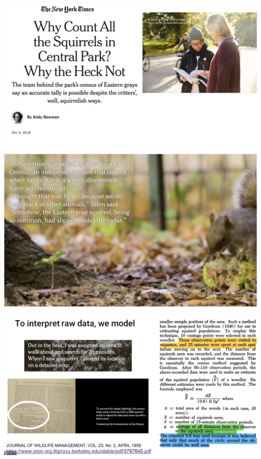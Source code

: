 \documentclass[aspectratio=169]{../latex_main/tntbeamer}  %
\begin{document}
	
	\begin{frame}
	    \includegraphics[scale=.6]{Bild3}
	\end{frame}
	
	\begin{frame}
	    \includegraphics[scale=.6]{Bild4}
	\end{frame}
	
	
	\begin{frame}
	    \includegraphics[scale=.37]{Bild5}
	\end{frame}
	
	
	
\end{document}
